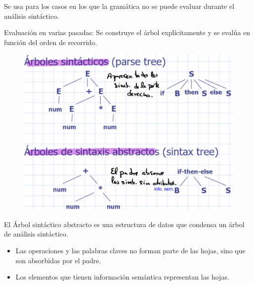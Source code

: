 \documentclass[12pt, twoside, openright]{report} %
\begin{document}
Se usa para los casos en los que la gramática no se puede evaluar durante el análisis sintáctico.

Evaluación en varias pasadas: Se construye el árbol explícitamente y se evalúa en función del orden de recorrido.

\begin{figure}[H]
  {\includegraphics[scale=.25]{2021-05-01 01_21_28-05_resum_Sem_2021.pdf - Foxit Reader.png}}
\end{figure}

El Árbol sintáctico abstracto es una estructura de datos que condensa un árbol de análisis sintáctico. 
\begin{itemize}
  \item Las operaciones y las palabras claves no forman parte de las hojas, sino que son absorbidas por el padre. 
  \item Los elementos que tienen información semántica representan las hojas.
\end{itemize}
\end{document}
